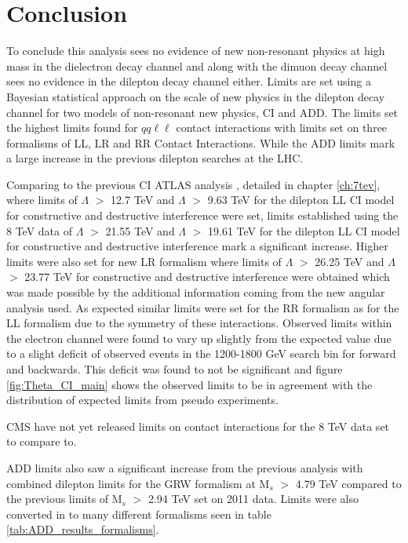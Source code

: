 \chapter{Conclusion}

To conclude this analysis sees no evidence of new non-resonant physics at high mass in the dielectron decay channel and along with the dimuon decay channel sees no evidence in the dilepton decay channel either. Limits are set using a Bayesian statistical approach on the scale of new physics in the dilepton decay channel for two models of non-resonant new physics, CI and ADD. The limits set the highest limits found for $qq\ell\ell$ contact interactions with limits set on three formalisms of LL, LR and RR Contact Interactions. While the ADD limits mark a large increase in the previous dilepton searches at the LHC.

Comparing to the previous CI ATLAS analysis \cite{PhysRevD.87.015010}, detailed in chapter \ref{ch:7tev}, where limits of $\Lambda$ $>$ 12.7 TeV and $\Lambda$ $>$ 9.63 TeV for the dilepton LL CI model for constructive and destructive interference were set, limits established using the 8 TeV data of $\Lambda$ $>$ 21.55 TeV and $\Lambda$ $>$ 19.61 TeV for the dilepton LL CI model for constructive and destructive interference mark a significant increase. Higher limits were also set for new LR formalism where limits of $\Lambda$ $>$ 26.25 TeV and $\Lambda$ $>$ 23.77 TeV for constructive and destructive interference were obtained which was made possible by the additional information coming from the new angular analysis used. As expected similar limits were set for the RR formalism as for the LL formalism due to the symmetry of these interactions. Observed limits within the electron channel were found to vary up slightly from the expected value due to a slight deficit of observed events in the 1200-1800 GeV search bin for forward and backwards. This deficit was found to not be significant and figure \ref{fig:Theta_CI_main} shows the observed limits to be in agreement with the distribution of expected limits from pseudo experiments.

CMS have not yet released limits on contact interactions for the 8 TeV data set to compare to.

ADD limits also saw a significant increase from the previous analysis \cite{PhysRevD.87.015010} with combined dilepton limits for the GRW formalism at M$_{s}$ $>$ 4.79 TeV compared to the previous limits of M$_{s}$ $>$ 2.94 TeV set on 2011 data. Limits were also converted in to many different formalisms seen in table \ref{tab:ADD_results_formalisms}. 

